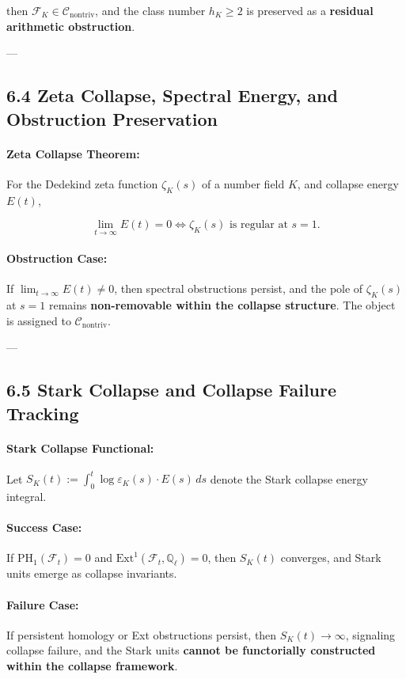 \documentclass[11pt]{article}
\begin{document}
then \( \mathcal{F}_K \in \mathcal{C}_{\mathrm{nontriv}} \), and the class number \( h_K \geq 2 \) is preserved as a \textbf{residual arithmetic obstruction}.

---

\subsection*{6.4 Zeta Collapse, Spectral Energy, and Obstruction Preservation}

\paragraph{Zeta Collapse Theorem:}
For the Dedekind zeta function \( \zeta_K(s) \) of a number field \( K \), and collapse energy \( E(t) \),

\[
\lim_{t \to \infty} E(t) = 0 \iff \zeta_K(s) \text{ is regular at } s = 1.
\]

\paragraph{Obstruction Case:}
If \( \lim_{t \to \infty} E(t) \neq 0 \), then spectral obstructions persist, and the pole of \( \zeta_K(s) \) at \( s = 1 \) remains \textbf{non-removable within the collapse structure}. The object is assigned to \( \mathcal{C}_{\mathrm{nontriv}} \).

---

\subsection*{6.5 Stark Collapse and Collapse Failure Tracking}

\paragraph{Stark Collapse Functional:}
Let \( S_K(t) := \int_0^t \log \varepsilon_K(s) \cdot E(s) \, ds \) denote the Stark collapse energy integral.

\paragraph{Success Case:}
If \( \mathrm{PH}_1(\mathcal{F}_t) = 0 \) and \( \mathrm{Ext}^1(\mathcal{F}_t, \mathbb{Q}_\ell) = 0 \), then \( S_K(t) \) converges, and Stark units emerge as collapse invariants.

\paragraph{Failure Case:}
If persistent homology or Ext obstructions persist, then \( S_K(t) \to \infty \), signaling collapse failure, and the Stark units \textbf{cannot be functorially constructed within the collapse framework}.
\end{document}
